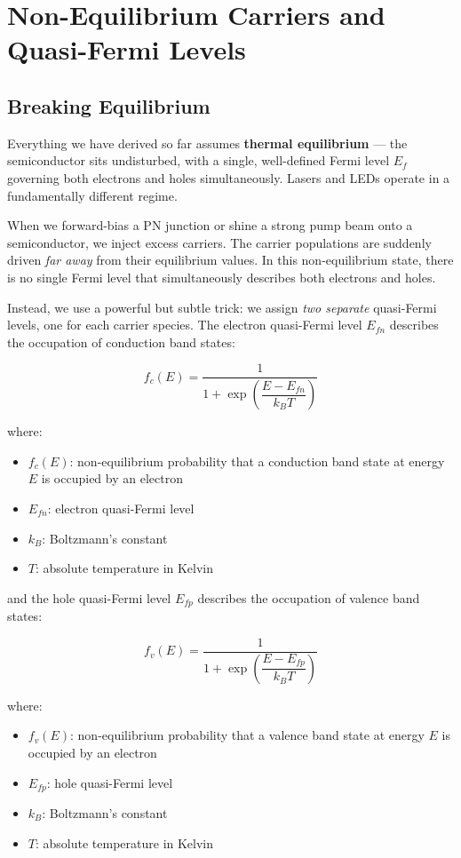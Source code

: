 \section{Non-Equilibrium Carriers and Quasi-Fermi Levels}

\subsection{Breaking Equilibrium}

Everything we have derived so far assumes \textbf{thermal equilibrium} — the semiconductor sits undisturbed, with a single, well-defined Fermi level $E_f$ governing both electrons and holes simultaneously. Lasers and LEDs operate in a fundamentally different regime.

When we forward-bias a PN junction or shine a strong pump beam onto a semiconductor, we inject excess carriers. The carrier populations are suddenly driven \emph{far away} from their equilibrium values. In this non-equilibrium state, there is no single Fermi level that simultaneously describes both electrons and holes.

Instead, we use a powerful but subtle trick: we assign \emph{two separate} quasi-Fermi levels, one for each carrier species. The electron quasi-Fermi level $E_{fn}$ describes the occupation of conduction band states:
\begin{keyresult}
    \begin{equation}
        f_c(E) = \frac{1}{1 + \exp\!\left(\dfrac{E - E_{fn}}{k_B T}\right)}
    \end{equation}
\end{keyresult}
where:
\begin{itemize}
    \item $f_c(E)$: non-equilibrium probability that a conduction band state at energy $E$ is occupied by an electron
    \item $E_{fn}$: electron quasi-Fermi level
    \item $k_B$: Boltzmann's constant
    \item $T$: absolute temperature in Kelvin
\end{itemize}

and the hole quasi-Fermi level $E_{fp}$ describes the occupation of valence band states:
\begin{keyresult}
    \begin{equation}
        f_v(E) = \frac{1}{1 + \exp\!\left(\dfrac{E - E_{fp}}{k_B T}\right)}
    \end{equation}
\end{keyresult}
where:
\begin{itemize}
    \item $f_v(E)$: non-equilibrium probability that a valence band state at energy $E$ is occupied by an electron
    \item $E_{fp}$: hole quasi-Fermi level
    \item $k_B$: Boltzmann's constant
    \item $T$: absolute temperature in Kelvin
\end{itemize}

